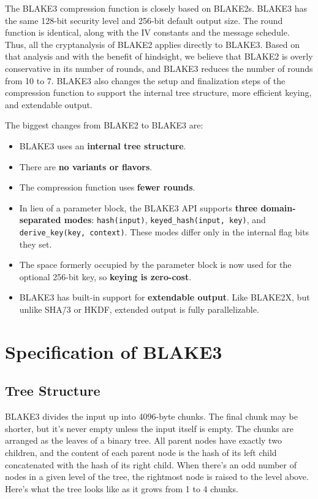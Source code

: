 \documentclass[11pt,notitlepage,a4paper]{article}
\begin{document}
The BLAKE3 compression function is closely based on BLAKE2s. BLAKE3 has the
same 128-bit security level and 256-bit default output size. The round function
is identical, along with the IV constants and the message schedule. Thus, all
the cryptanalysis of BLAKE2 applies directly to BLAKE3. Based on that analysis
and with the benefit of hindsight, we believe that BLAKE2 is overly
conservative in its number of rounds, and BLAKE3 reduces the number of rounds
from 10 to 7. BLAKE3 also changes the setup and finalization steps of the
compression function to support the internal tree structure, more efficient
keying, and extendable output.

The biggest changes from BLAKE2 to BLAKE3 are:

\begin{itemize}
    \item BLAKE3 uses an \textbf{internal tree structure}.
    \item There are \textbf{no variants or flavors}.
    \item The compression function uses \textbf{fewer rounds}.
    \item In lieu of a parameter block, the BLAKE3 API supports \textbf{three
        domain-separated modes}: \texttt{hash(input)},
        \texttt{keyed\_hash(input, key)}, and \texttt{derive\_key(key,
        context)}. These modes differ only in the internal flag bits they set.
    \item The space formerly occupied by the parameter block is now used for
        the optional 256-bit key, so \textbf{keying is zero-cost}.
    \item BLAKE3 has built-in support for \textbf{extendable output}. Like
        BLAKE2X, but unlike SHA\=/3 or HKDF, extended output is fully
        parallelizable.
\end{itemize}

\nocite{DBLP:journals/iacr/AumassonNWW13,DBLP:journals/rfc/rfc7693,DBLP:journals/tosc/LuykxMN16}

\section{Specification of BLAKE3}\label{sec:specification}

\subsection{Tree Structure}\label{sec:tree}

BLAKE3 divides the input up into 4096-byte chunks. The final chunk may be shorter, but it's never empty unless the input itself is empty. The chunks are arranged as the leaves of a binary tree. All parent nodes have exactly two children, and the content of each parent node is the hash of its left child concatenated with the hash of its right child. When there's an odd number of nodes in a given level of the tree, the rightmost node is raised to the level above. Here's what the tree looks like as it grows from 1 to 4 chunks.
\end{document}
